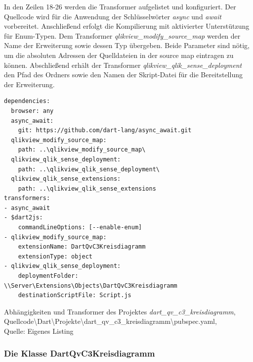 In den Zeilen 18-26 werden die Transformer aufgelistet und konfiguriert. Der Quellcode wird für die Anwendung der Schlüsselwörter \textit{async} und \textit{await} vorbereitet. Anschließend erfolgt die Kompilierung mit aktivierter Unterstützung für Enum-Typen. Dem Transformer \textit{qlikview\_modify\_source\_map} werden der Name der Erweiterung sowie dessen Typ übergeben. Beide Parameter sind nötig, um die absoluten Adressen der Quelldateien in der source map eintragen zu können. Abschließend erhält der Transformer \textit{qlikview\_qlik\_sense\_deployment} den Pfad des Ordners sowie den Namen der Skript-Datei für die Bereitstellung der Erweiterung.

\begin{listing}[htbp]
\begin{verbatim}
dependencies:
  browser: any
  async_await:
    git: https://github.com/dart-lang/async_await.git
  qlikview_modify_source_map:
    path: ..\qlikview_modify_source_map\
  qlikview_qlik_sense_deployment:
    path: ..\qlikview_qlik_sense_deployment\
  qlikview_qlik_sense_extensions:
    path: ..\qlikview_qlik_sense_extensions
transformers:
- async_await
- $dart2js:
    commandLineOptions: [--enable-enum]
- qlikview_modify_source_map:
    extensionName: DartQvC3Kreisdiagramm
    extensionType: object
- qlikview_qlik_sense_deployment:
    deploymentFolder: \\Server\Extensions\Objects\DartQvC3Kreisdiagramm
    destinationScriptFile: Script.js
\end{verbatim}
\caption[Abhängigkeiten und Transformer des Projektes \textit{dart\_qv\_c3\_kreisdiagramm}]{Abhängigkeiten und Transformer des Projektes \textit{dart\_qv\_c3\_kreisdiagramm}, \\Quellcode\textbackslash{}Dart\textbackslash{}Projekte\textbackslash{}dart\_qv\_c3\_kreisdiagramm\textbackslash{}pubspec.yaml, \\Quelle: Eigenes Listing}
\label{lst:DartQvC3KreisdiagrammPubspecYaml}
\end{listing}


\subsubsection{Die Klasse DartQvC3Kreisdiagramm}
\label{lab:DieKlasseDartQvC3Kreisdiagramm} 


